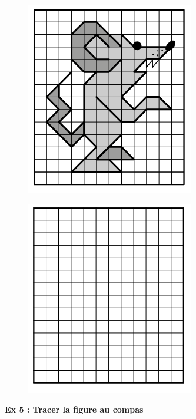 \begin{multicols}{2} 
\begin{figure}[H]
  \centering
  \includegraphics[width=0.6\linewidth]{6x4-symetrie/ex4c.png}
\end{figure}

\begin{figure}[H]
  \centering
  \includegraphics[width=0.6\linewidth]{6x4-symetrie/ex4d.png}
\end{figure}
\end{multicols}

\newpage
\textbf{Ex 5 : Tracer la figure au compas}

